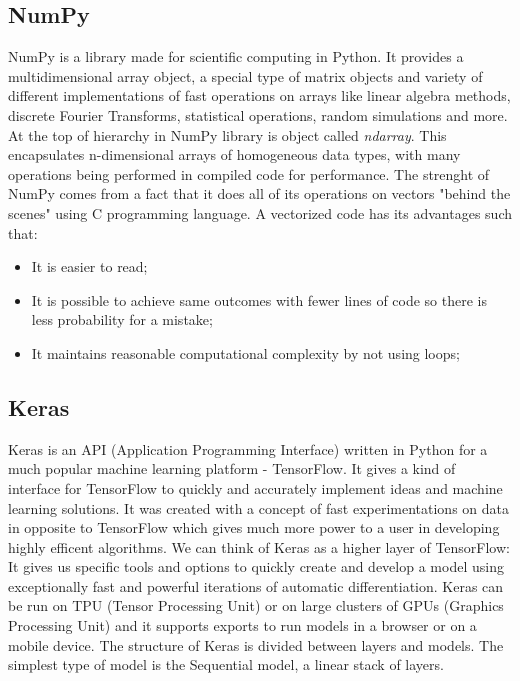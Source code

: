 \documentclass[a4paper,oneside,openright,11pt]{book}
\begin{document}
\subsection{NumPy}


NumPy \cite{numpy} is a library made for scientific computing in Python. It provides a multidimensional array object, a special type of matrix objects and variety of different implementations of fast operations on arrays like linear algebra methods, discrete Fourier Transforms, statistical operations, random simulations and more. At the top of hierarchy in NumPy library is object called \emph{ndarray}. This encapsulates n-dimensional arrays of homogeneous data types, with many operations being performed in compiled code for performance. The strenght of NumPy comes from a fact that it does all of its operations on vectors "behind the scenes" using C programming language. A vectorized code has its advantages such that:

\begin{itemize}
    \item It is easier to read;
    \item It is
    possible to achieve same outcomes with fewer lines of code so there is less probability for a mistake;
    \item It maintains reasonable computational complexity by not using loops;
\end{itemize}


\subsection{Keras}

Keras \cite{Keras} is an API (Application Programming Interface) written in Python for a much popular machine learning platform - TensorFlow. It gives a kind of interface for TensorFlow to quickly and accurately implement ideas and machine learning solutions. It was created with a concept of fast experimentations on data in opposite to TensorFlow which gives much more power to a user in developing highly efficent algorithms. We can think of Keras as a higher layer of TensorFlow: It gives us specific tools and options to quickly create and develop a model using exceptionally fast and powerful iterations of automatic differentiation. Keras can be run on TPU (Tensor Processing Unit) or on large clusters of GPUs (Graphics Processing Unit) and it supports exports to run models in a browser or on a mobile device. The structure of Keras is divided between layers and models. The simplest type of model is the Sequential model, a linear stack of layers. 
\end{document}
